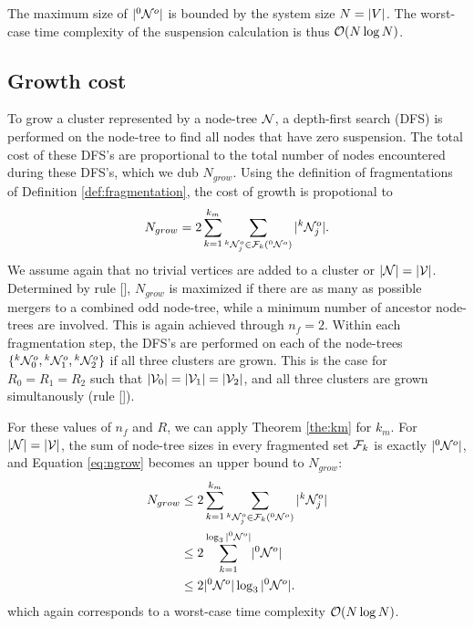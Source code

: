 The maximum size of $\lvert{}^{0}\mathcal{N}^o\rvert$ is bounded by the system size $N = \lvert V\rvert$. The worst-case time complexity of the suspension calculation is thus $\mathcal{O}(N\log{N})$. 

\subsection{Growth cost}\label{sec:growthcost}

To grow a cluster represented by a node-tree $\mathcal{N}$, a depth-first search (DFS) is performed on the node-tree to find all nodes that have zero suspension. The total cost of these DFS's are proportional to the total number of nodes encountered during these DFS's, which we dub $N_{grow}$. Using the definition of fragmentations of Definition \ref{def:fragmentation}, the cost of growth is propotional to
\begin{equation}\label{eq:ngrow}
  N_{grow} = 2\sum_{k=1}^{k_{m}}{ \sum_{ \pre{k}\nset_j^o \in \m{F}_k(\pre{0}\nset^o) }{ \abs{\pre{k}\nset_j^o} } }.
\end{equation}
We assume again that no trivial vertices are added  to a cluster or $|\mathcal{N}| = |\mathcal{V}|$. Determined by rule [], $N_{grow}$ is maximized if there are as many as possible mergers to a combined odd node-tree, while a minimum number of ancestor node-trees are involved. This is again achieved through $n_f = 2$. Within each fragmentation step, the DFS's are performed on each of the node-trees $\{{}^{k}\mathcal{N}^o_0, {}^{k}\mathcal{N}^o_1, {}^{k}\mathcal{N}^o_2\}$ if all three clusters are grown. This is the case for $R_0 = R_1 = R_2$ such that $\lvert\mathcal{V}_0\rvert= \lvert\mathcal{V}_1\rvert=\lvert\mathcal{V}_2\rvert$, and all three clusters are grown simultanously (rule []). 

For these values of $n_f$ and $R$, we can apply Theorem \ref{the:km} for $k_m$. For $|\mathcal{N}| = |\mathcal{V}|$, the sum of node-tree sizes in every fragmented set $\mathcal{F}_k$ is exactly $\lvert{}^{0}\mathcal{N}^o\rvert$, and Equation \eqref{eq:ngrow} becomes an upper bound to $N_{grow}$: 
\begin{align*}
  \nonumber N_{grow} &\leq 2\sum_{k=1}^{k_{m}}{ \sum_{{}^{k}\mathcal{N}_j^o \in \mathcal{F}_k({}^{0}\mathcal{N}^o)}{ \lvert{}^{k}\mathcal{N}_j^o\rvert } } \\
  \nonumber         &\leq 2\sum_{k=1}^{\log_3{\lvert{}^{0}\mathcal{N}^o\rvert}} \lvert{}^{0}\mathcal{N}^o\rvert\\
                    &\leq 2\lvert{}^{0}\mathcal{N}^o\rvert\log_3{\lvert{}^{0}\mathcal{N}^o\rvert}.
\end{align*}
which again corresponds to a worst-case time complexity $\mathcal{O}(N\log{N})$.